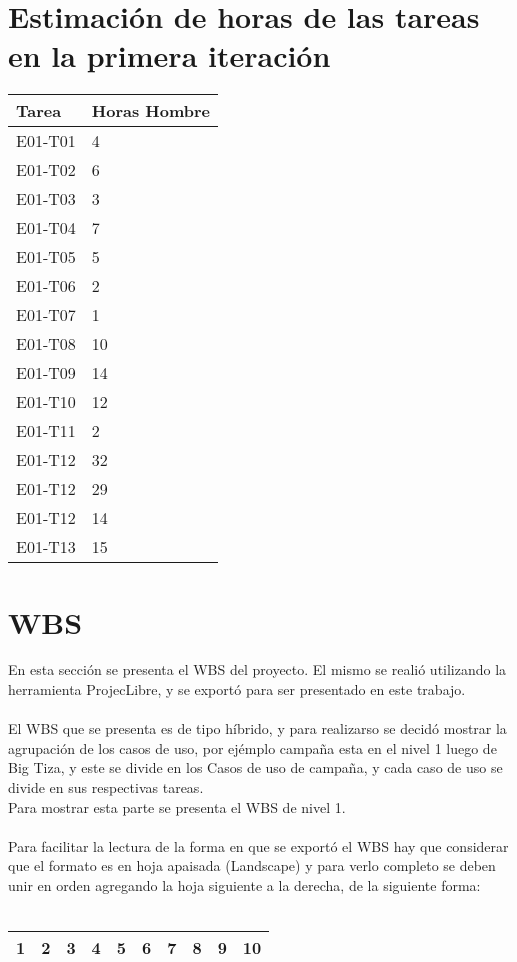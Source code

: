\documentclass[a4paper, 11pt]{article}
\begin{document}
\section{Estimaci\'on de horas de las tareas en la primera iteraci\'on}
\begin{tabular}{| p{5cm} | p{5cm} |}

\hline
\bf{Tarea} & \bf{Horas Hombre} \\ \hline \hline
E01-T01 & 4 \\ \hline
E01-T02 & 6 \\ \hline
E01-T03 & 3 \\ \hline
E01-T04 & 7 \\ \hline
E01-T05 & 5 \\ \hline
E01-T06 & 2  \\ \hline
E01-T07 & 1 \\ \hline
E01-T08 & 10 \\ \hline
E01-T09 & 14 \\ \hline
E01-T10 & 12 \\ \hline
E01-T11 & 2 \\ \hline
E01-T12 & 32 \\ \hline
E01-T12 & 29 \\ \hline
E01-T12 & 14 \\ \hline
E01-T13 & 15 \\ \hline
\end{tabular}

\section{WBS}
En esta secci\'on se presenta el WBS del proyecto. El mismo se reali\'o utilizando la herramienta ProjecLibre, y se export\'o para ser presentado en este trabajo. \\
\\
El WBS que se presenta es de tipo h\'ibrido, y para realizarso se decid\'o mostrar la agrupaci\'on de los casos de uso, por ej\'emplo campaña esta en el nivel 1 luego de Big Tiza, y este se divide en los Casos de uso de campaña, y cada caso de uso se divide en sus respectivas tareas.\\
Para mostrar esta parte se presenta el WBS de nivel 1.\\
\\
Para facilitar la lectura de la forma en que se export\'o el WBS hay que considerar que el formato es en hoja apaisada (Landscape) y para verlo completo se deben unir en orden agregando la hoja siguiente a la derecha, de la siguiente forma:\\
\\
\begin{tabular}{| p{1cm} | p{1cm} | p{1cm} | p{1cm} | p{1cm} | p{1cm} | p{1cm} | p{1cm} | p{1cm} | p{1cm} |}
\hline
1 & 2 & 3 & 4 & 5 & 6 & 7 & 8 & 9 & 10 \\ \hline
\end{tabular}
\end{document}
